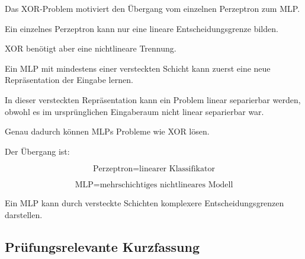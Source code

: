 \documentclass[11pt,a4paper]{scrartcl}
\begin{document}
\begin{notebox}
    Das XOR-Problem motiviert den Übergang vom einzelnen Perzeptron zum MLP.

    Ein einzelnes Perzeptron kann nur eine lineare Entscheidungsgrenze bilden.

    XOR benötigt aber eine nichtlineare Trennung.
\end{notebox}

\begin{solutionbox}
    Ein MLP mit mindestens einer versteckten Schicht kann zuerst eine neue
    Repräsentation der Eingabe lernen.

    In dieser versteckten Repräsentation kann ein Problem linear separierbar
    werden, obwohl es im ursprünglichen Eingaberaum nicht linear separierbar war.

    Genau dadurch können MLPs Probleme wie XOR lösen.
\end{solutionbox}

\begin{answerbox}
    Der Übergang ist:

    \[
        \boxed{
            \text{Perzeptron}
            =
            \text{linearer Klassifikator}
        }
    \]

    \[
        \boxed{
            \text{MLP}
            =
            \text{mehrschichtiges nichtlineares Modell}
        }
    \]

    Ein MLP kann durch versteckte Schichten komplexere Entscheidungsgrenzen
    darstellen.
\end{answerbox}

\subsection{Prüfungsrelevante Kurzfassung}
\end{document}

